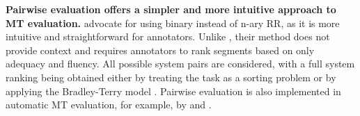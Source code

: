 \noindent \textbf{Pairwise evaluation offers a simpler and more intuitive approach to MT evaluation.} \citet{vilar-etal-2007-human} advocate for using binary instead of n-ary RR, as it is more intuitive and straightforward for annotators. Unlike \sxsqr, their method does not provide context and requires annotators to rank segments based on only adequacy and fluency. All possible system pairs are considered, with a full system ranking being obtained either by treating the task as a sorting problem or by applying the Bradley-Terry model \citep{Bradley1952RankAO, dras-2015-squibs}. Pairwise evaluation is also implemented in automatic MT evaluation, for example, by \citet{guzman-etal-2015-pairwise} and \citet{liu2024aligning}.





















